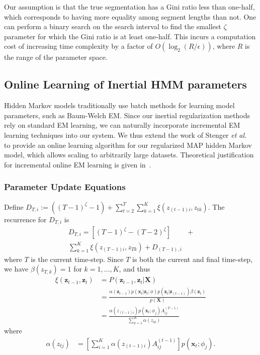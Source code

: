 \documentclass[letterpaper]{article}
\begin{document}
Our assumption is that the true segmentation has a Gini ratio less than one-half, which corresponds to having more equality among segment lengths than not. One can perform a binary search on the search interval to find the smallest $\zeta$ parameter for which the Gini ratio is at least one-half. This incurs a computation cost of increasing time complexity by a factor of $O(\log_2 (R / \epsilon))$, where $R$ is the range of the parameter space.

\subsection{Online Learning of Inertial HMM parameters}

Hidden Markov models traditionally use batch methods for learning model parameters, such as Baum-Welch EM. Since our inertial regularization methods rely on standard EM learning, we can naturally incorporate incremental EM learning techniques into our system. We thus extend the work of Stenger \emph{et al.}~\cite{stenger2001} to provide an online learning algorithm for our regularized MAP hidden Markov model, which allows scaling to arbitrarily large datasets. Theoretical justification for incremental online EM learning is given in~\cite{Neal:1999:VEA:308574.308679}.

\subsubsection{Parameter Update Equations}

Define $D_{T,i} := ((T-1)^\zeta -1) + \sum_{t=2}^{T}\sum_{k=1}^{K} \xi(z_{(t-1)i}, z_{tk})$. The recurrence for $D_{T,i}$ is
\begin{align*}
    D_{T,i} = [(T-1)^\zeta - (T-2)^\zeta] &+\\  \sum_{k=1}^{K} \xi(z_{(T-1)i}, z_{Tk}) + D_{(T-1), i}
\end{align*}
where $T$ is the current time-step. Since $T$ is both the current and final time-step, we have $\beta(z_{T,k}) = 1$ for $k = 1, \ldots, K$, and thus
\begin{align*}
    \xi(\mathbf{z}_{t-1}, \mathbf{z}_{t}) 
            &= P(\mathbf{z}_{t-1}, \mathbf{z}_{t} | \mathbf{X}) \\
            &= \frac{\alpha(\mathbf{z}_{t-1})p(\mathbf{x}_t|\mathbf{z}_t; \phi)p(\mathbf{z}_{t}|\mathbf{z}_{(t-1)})\beta(\mathbf{z}_t)}{p(\mathbf{X})} \\
            &= \frac{\alpha(z_{(t-1)i})p(\mathbf{x}_t; \phi_j)A_{ij}^{(T-1)}}{\sum_{k=1}^{K}\alpha(z_{tk})}
\end{align*}
where
\begin{align*}
    \alpha(z_{tj}) &= \left[\sum_{i=1}^{K} \alpha(z_{(t-1)i})A_{ij}^{(t-1)}\right]p(\mathbf{x}_t; \phi_j).
\end{align*}
\end{document}
